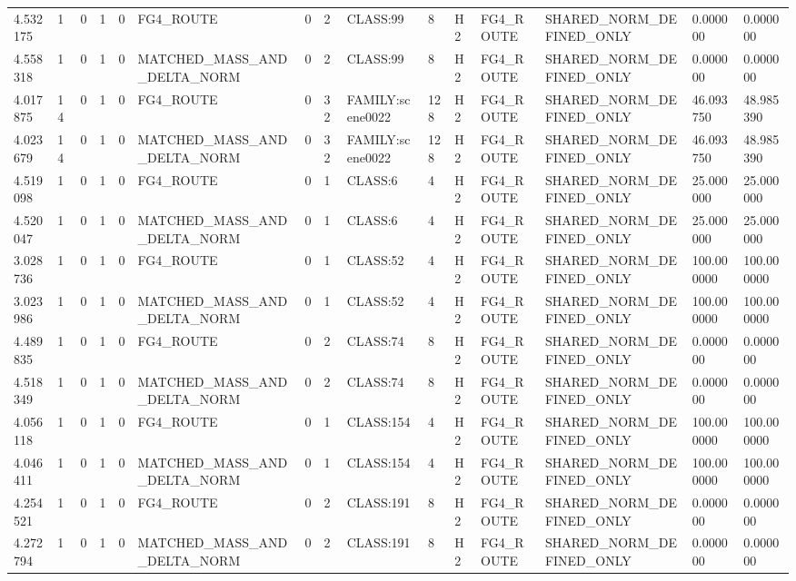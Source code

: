 \begin{tabular}{lllllllllllllll}
4.532175 & 1 & 0 & 1 & 0 & FG4\_ROUTE & 0 & 2 & CLASS:99 & 8 & H2 & FG4\_ROUTE & SHARED\_NORM\_DEFINED\_ONLY & 0.000000 & 0.000000 \\
4.558318 & 1 & 0 & 1 & 0 & MATCHED\_MASS\_AND\_DELTA\_NORM & 0 & 2 & CLASS:99 & 8 & H2 & FG4\_ROUTE & SHARED\_NORM\_DEFINED\_ONLY & 0.000000 & 0.000000 \\
4.017875 & 14 & 0 & 1 & 0 & FG4\_ROUTE & 0 & 32 & FAMILY:scene0022 & 128 & H2 & FG4\_ROUTE & SHARED\_NORM\_DEFINED\_ONLY & 46.093750 & 48.985390 \\
4.023679 & 14 & 0 & 1 & 0 & MATCHED\_MASS\_AND\_DELTA\_NORM & 0 & 32 & FAMILY:scene0022 & 128 & H2 & FG4\_ROUTE & SHARED\_NORM\_DEFINED\_ONLY & 46.093750 & 48.985390 \\
4.519098 & 1 & 0 & 1 & 0 & FG4\_ROUTE & 0 & 1 & CLASS:6 & 4 & H2 & FG4\_ROUTE & SHARED\_NORM\_DEFINED\_ONLY & 25.000000 & 25.000000 \\
4.520047 & 1 & 0 & 1 & 0 & MATCHED\_MASS\_AND\_DELTA\_NORM & 0 & 1 & CLASS:6 & 4 & H2 & FG4\_ROUTE & SHARED\_NORM\_DEFINED\_ONLY & 25.000000 & 25.000000 \\
3.028736 & 1 & 0 & 1 & 0 & FG4\_ROUTE & 0 & 1 & CLASS:52 & 4 & H2 & FG4\_ROUTE & SHARED\_NORM\_DEFINED\_ONLY & 100.000000 & 100.000000 \\
3.023986 & 1 & 0 & 1 & 0 & MATCHED\_MASS\_AND\_DELTA\_NORM & 0 & 1 & CLASS:52 & 4 & H2 & FG4\_ROUTE & SHARED\_NORM\_DEFINED\_ONLY & 100.000000 & 100.000000 \\
4.489835 & 1 & 0 & 1 & 0 & FG4\_ROUTE & 0 & 2 & CLASS:74 & 8 & H2 & FG4\_ROUTE & SHARED\_NORM\_DEFINED\_ONLY & 0.000000 & 0.000000 \\
4.518349 & 1 & 0 & 1 & 0 & MATCHED\_MASS\_AND\_DELTA\_NORM & 0 & 2 & CLASS:74 & 8 & H2 & FG4\_ROUTE & SHARED\_NORM\_DEFINED\_ONLY & 0.000000 & 0.000000 \\
4.056118 & 1 & 0 & 1 & 0 & FG4\_ROUTE & 0 & 1 & CLASS:154 & 4 & H2 & FG4\_ROUTE & SHARED\_NORM\_DEFINED\_ONLY & 100.000000 & 100.000000 \\
4.046411 & 1 & 0 & 1 & 0 & MATCHED\_MASS\_AND\_DELTA\_NORM & 0 & 1 & CLASS:154 & 4 & H2 & FG4\_ROUTE & SHARED\_NORM\_DEFINED\_ONLY & 100.000000 & 100.000000 \\
4.254521 & 1 & 0 & 1 & 0 & FG4\_ROUTE & 0 & 2 & CLASS:191 & 8 & H2 & FG4\_ROUTE & SHARED\_NORM\_DEFINED\_ONLY & 0.000000 & 0.000000 \\
4.272794 & 1 & 0 & 1 & 0 & MATCHED\_MASS\_AND\_DELTA\_NORM & 0 & 2 & CLASS:191 & 8 & H2 & FG4\_ROUTE & SHARED\_NORM\_DEFINED\_ONLY & 0.000000 & 0.000000 \\

\end{tabular}
